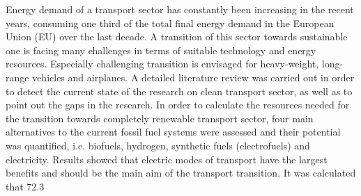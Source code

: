 Energy demand of a transport sector has constantly been increasing in the recent years, consuming one third of the total final energy demand in the European Union (EU) over the last decade. A transition of this sector towards sustainable one is facing many challenges in terms of suitable technology and energy resources. Especially challenging transition is envisaged for heavy-weight, long-range vehicles and airplanes. A detailed literature review was carried out in order to detect the current state of the research on clean transport sector, as well as to point out the gaps in the research. In order to calculate the resources needed for the transition towards completely renewable transport sector, four main alternatives to the current fossil fuel systems were assessed and their potential was quantified, i.e. biofuels, hydrogen, synthetic fuels (electrofuels) and electricity. Results showed that electric modes of transport have the largest benefits and should be the main aim of the transport transition. It was calculated that 72.3%